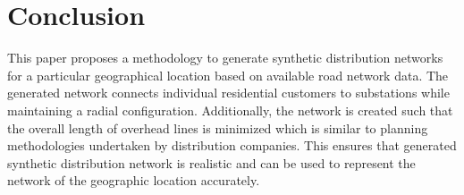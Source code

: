 \documentclass[sigconf]{acmart}
\begin{document}
\section{Conclusion}
This paper proposes a methodology to generate synthetic distribution networks for a particular geographical location based on available road network data. The generated network connects individual residential customers to substations while maintaining a radial configuration. Additionally, the network is created such that the overall length of overhead lines is minimized which is similar to planning methodologies undertaken by distribution companies. This ensures that generated synthetic distribution network is realistic and can be used to represent the network of the geographic location accurately. 





\end{document}

